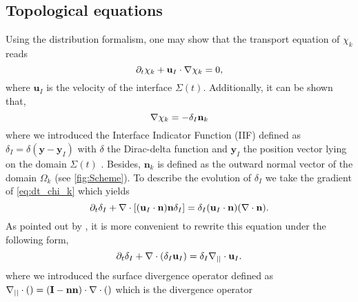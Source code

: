 \subsection{Topological equations}

Using the distribution formalism, one may show that the transport equation of $\chi_k$ reads\citep{drew1983mathematical} %
\begin{equation}
    \partial_t \chi_k
    + \textbf{u}_I \cdot \mathbf{\nabla} \chi_k
    = 0,
    \label{eq:dt_chi_k}
\end{equation}
where $\textbf{u}_I$ is the velocity of the interface $\Sigma(t)$.
Additionally, it can be shown \citep{tryggvason2011direct,drew1983mathematical,kataoka1986local,bothe2022sharp}  that,
\begin{equation}
    \mathbf{\nabla} \chi_k
    = - \delta_I \textbf{n}_k
    \label{eq:grad_chi_k}
\end{equation}
where we introduced the Interface Indicator Function (IIF) defined as $\delta_I = \delta(\textbf{y}-\textbf{y}_I)$ with $\delta$  the Dirac-delta function and $\textbf{y}_I$ the position vector lying on the domain $\Sigma(t)$ .
Besides, $\textbf{n}_k$ is defined as the outward normal vector of the domain $\Omega_k$ (see \ref{fig:Scheme}).
To describe the evolution of $\delta_I$ we take the gradient of \ref{eq:dt_chi_k} which yields %
\begin{equation}
    \partial_t \delta_I
    + \mathbf{\nabla} \cdot \left[(\textbf{u}_I\cdot\textbf{n})\textbf{n} \delta_I\right]
    = \delta_I (\textbf{u}_I\cdot\textbf{n})(\mathbf{\nabla} \cdot\textbf{n}). 
\end{equation}
As pointed out by \citet{morel2007surface}, it is more convenient to rewrite this equation under the following form,
\begin{equation}
    \partial_t \delta_I
    + \mathbf{\nabla} \cdot (\delta_I \textbf{u}_I)
    = \delta_I \mathbf{\nabla}_{||} \cdot \textbf{u}_I.
    \label{eq:dt_delta_I}
\end{equation}
where we introduced the surface divergence operator defined as $\mathbf{\nabla}_{||} \cdot ()= (\textbf{I}-\textbf{nn})\cdot \mathbf{\nabla} \cdot ()$ which is the  divergence operator 


